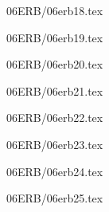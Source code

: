 \documentclass[9pt, xcolor={svgnames, x11names},professionalfonts]{beamer}
\def\scale{1}
\begin{document}

\begin{frame}{06ERB/06erb18.tex}	
	\def\scale{0.55}
	
\end{frame}


\begin{frame}{06ERB/06erb19.tex}	
	\def\scale{0.55}
	
\end{frame}


\begin{frame}{06ERB/06erb20.tex}	
	\def\scale{0.875}
	
\end{frame}


\begin{frame}{06ERB/06erb21.tex}	
	\def\scale{0.75}
	
\end{frame}


\begin{frame}{06ERB/06erb22.tex}	
	\def\scale{0.75}
	
\end{frame}


\begin{frame}{06ERB/06erb23.tex}	
	\def\scale{0.75}
	
\end{frame}


\begin{frame}{06ERB/06erb24.tex}	
	\def\scale{0.75}
	
\end{frame}


\begin{frame}{06ERB/06erb25.tex}	
	\def\scale{0.5}
	
\end{frame}




\end{document}
